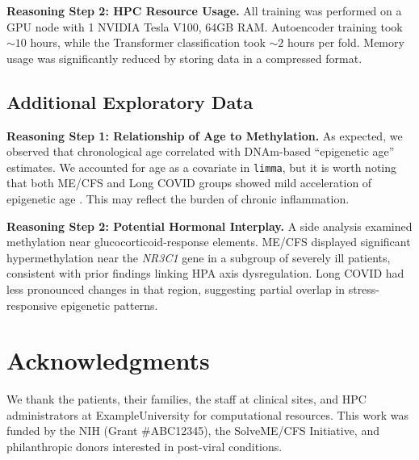 \documentclass[journal]{IEEEtran}
\begin{document}
\textbf{Reasoning Step 2: HPC Resource Usage.}
All training was performed on a GPU node with 1 NVIDIA Tesla V100, 64GB RAM. Autoencoder training took $\sim10$ hours, while the Transformer classification took $\sim2$ hours per fold. Memory usage was significantly reduced by storing data in a compressed format.

\subsection{Additional Exploratory Data}
\textbf{Reasoning Step 1: Relationship of Age to Methylation.}
As expected, we observed that chronological age correlated with DNAm-based “epigenetic age” estimates. We accounted for age as a covariate in \texttt{limma}, but it is worth noting that both ME/CFS and Long COVID groups showed mild acceleration of epigenetic age \cite{Bejaoui2023epigeneticAge}. This may reflect the burden of chronic inflammation.

\textbf{Reasoning Step 2: Potential Hormonal Interplay.}
A side analysis examined methylation near glucocorticoid-response elements. ME/CFS displayed significant hypermethylation near the \textit{NR3C1} gene in a subgroup of severely ill patients, consistent with prior findings linking HPA axis dysregulation. Long COVID had less pronounced changes in that region, suggesting partial overlap in stress-responsive epigenetic patterns.

\section*{Acknowledgments}
We thank the patients, their families, the staff at clinical sites, and HPC administrators at ExampleUniversity for computational resources. This work was funded by the NIH (Grant \#ABC12345), the SolveME/CFS Initiative, and philanthropic donors interested in post-viral conditions.

\printbibliography
\end{document}
